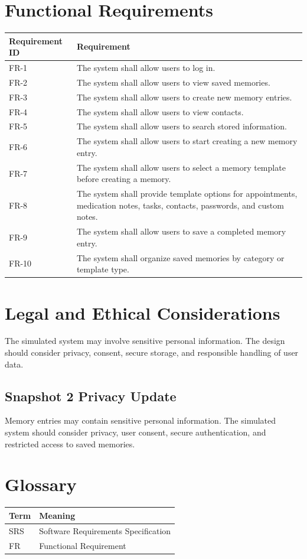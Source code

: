 \documentclass{article}
\begin{document}
\section{Functional Requirements}
\begin{longtable}{|p{3cm}|p{10cm}|}
\hline
Requirement ID & Requirement \\ \hline
FR-1 & The system shall allow users to log in. \\ \hline
FR-2 & The system shall allow users to view saved memories. \\ \hline
FR-3 & The system shall allow users to create new memory entries. \\ \hline
FR-4 & The system shall allow users to view contacts. \\ \hline
FR-5 & The system shall allow users to search stored information. \\ \hline
FR-6 & The system shall allow users to start creating a new memory entry. \\ \hline
FR-7 & The system shall allow users to select a memory template before creating a memory. \\ \hline
FR-8 & The system shall provide template options for appointments, medication notes, tasks, contacts, passwords, and custom notes. \\ \hline
FR-9 & The system shall allow users to save a completed memory entry. \\ \hline
FR-10 & The system shall organize saved memories by category or template type. \\ \hline
\end{longtable}

\section{Legal and Ethical Considerations}
The simulated system may involve sensitive personal information. The design should consider privacy, consent, secure storage, and responsible handling of user data.

\subsection{Snapshot 2 Privacy Update}

Memory entries may contain sensitive personal information. The simulated system should consider privacy, user consent, secure authentication, and restricted access to saved memories.

\section{Glossary}
\begin{longtable}{|p{3cm}|p{10cm}|}
\hline
Term & Meaning \\ \hline
SRS & Software Requirements Specification \\ \hline
FR & Functional Requirement \\ \hline
\end{longtable}
\end{document}
